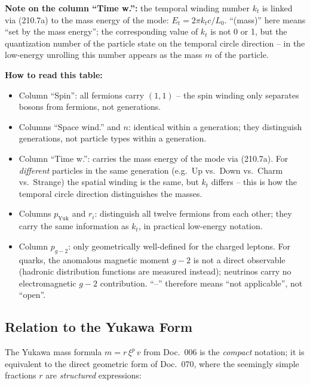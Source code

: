 \textbf{Note on the column \enquote{Time w.}:} the temporal winding
number $k_t$ is linked via (210.7a) to the mass energy of the mode:
$E_t = 2\pi k_t c / L_0$. \enquote{(mass)} here means \enquote{set
by the mass energy}; the corresponding value of $k_t$ is not 0 or 1,
but the quantization number of the particle state on the temporal
circle direction -- in the low-energy unrolling this number appears
as the mass $m$ of the particle.

\textbf{How to read this table:}
\begin{itemize}
  \item Column \enquote{Spin}: all fermions carry $(1,1)$ -- the spin
        winding only separates bosons from fermions, not generations.
  \item Columns \enquote{Space wind.} and $n$: identical within a
        generation; they distinguish generations, not particle types
        within a generation.
  \item Column \enquote{Time w.}: carries the mass energy of the mode
        via (210.7a). For \emph{different} particles in the same
        generation (e.g.\ Up vs.\ Down vs.\ Charm vs.\ Strange) the
        spatial winding is the same, but $k_t$ differs -- this is
        how the temporal circle direction distinguishes the masses.
  \item Columns $p_{\text{Yuk}}$ and $r_i$: distinguish all twelve
        fermions from each other; they carry the same information as
        $k_t$, in practical low-energy notation.
  \item Column $p_{g\!-\!2}$: only geometrically well-defined for
        the charged leptons. For quarks, the anomalous magnetic
        moment $g\!-\!2$ is not a direct observable (hadronic
        distribution functions are measured instead); neutrinos
        carry no electromagnetic $g\!-\!2$ contribution.
        \enquote{--} therefore means \enquote{not applicable}, not
        \enquote{open}.
\end{itemize}

\subsection*{Relation to the Yukawa Form}

The Yukawa mass formula $m = r\,\xi^p\,v$ from Doc.~006 is the
\emph{compact} notation; it is equivalent to the direct geometric form
of Doc.~070, where the seemingly simple fractions $r$ are
\emph{structured} expressions:

